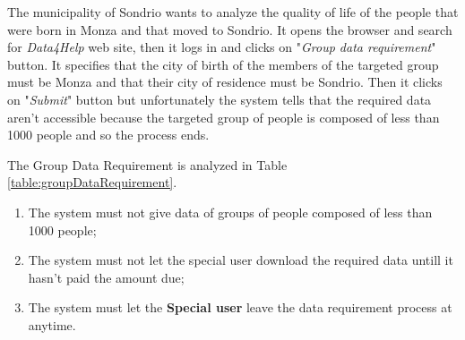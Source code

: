 The municipality of Sondrio wants to analyze the quality of life of the people that were born in Monza and that moved to Sondrio.  It opens the browser and search for \textit{Data4Help} web site, then it logs in and clicks on "\textit{Group data requirement}" button. It specifies that the city of birth of the members of the targeted group must be Monza and that their city of residence must be Sondrio. Then it clicks on "\textit{Submit}" button but unfortunately the system tells that the required data aren't accessible because the targeted group of people is composed of less than 1000 people and so the process ends.

The Group Data Requirement is analyzed in Table \ref{table:groupDataRequirement}.

\begin{enumerate}
  \item The system must not give data of groups of people composed of less than 1000 people;
  \item The system must not let the special user download the required data untill it hasn't paid the amount due;
  \item The system must let the \textbf{Special user} leave the data requirement process at anytime.
\end{enumerate}

